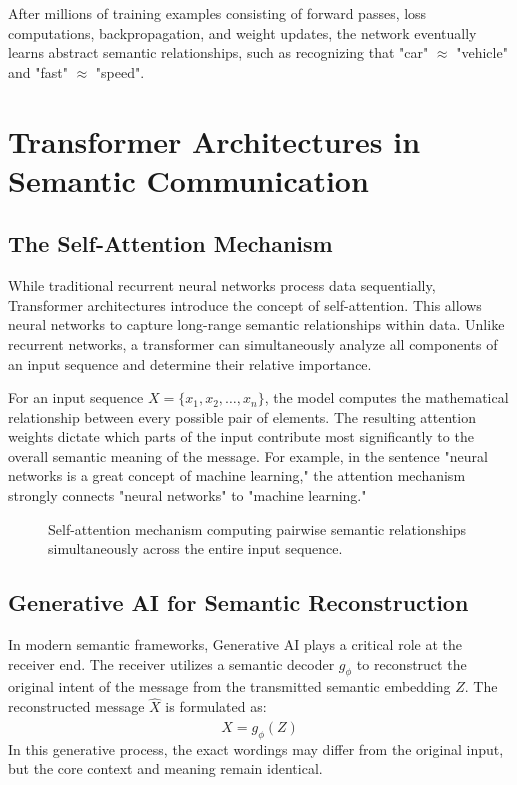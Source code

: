 \documentclass[10pt, conference]{IEEEtran}
\begin{document}
After millions of training examples consisting of forward passes, loss computations, backpropagation, and weight updates, the network eventually learns abstract semantic relationships, such as recognizing that "car" $\approx$ "vehicle" and "fast" $\approx$ "speed".

\section{\large \textbf{Transformer Architectures in Semantic Communication}}

\subsection{\textbf{The Self-Attention Mechanism}}
While traditional recurrent neural networks process data sequentially, Transformer architectures introduce the concept of self-attention. This allows neural networks to capture long-range semantic relationships within data. Unlike recurrent networks, a transformer can simultaneously analyze all components of an input sequence and determine their relative importance.

For an input sequence $X = \{x_1, x_2, \dots, x_n\}$, the model computes the mathematical relationship between every possible pair of elements. The resulting attention weights dictate which parts of the input contribute most significantly to the overall semantic meaning of the message. For example, in the sentence "neural networks is a great concept of machine learning," the attention mechanism strongly connects "neural networks" to "machine learning."

\begin{figure}[h]
\centering
{}
\caption{Self-attention mechanism computing pairwise semantic relationships simultaneously across the entire input sequence.}
\label{fig:self_attention}
\end{figure}

\subsection{\textbf{Generative AI for Semantic Reconstruction}}
In modern semantic frameworks, Generative AI plays a critical role at the receiver end. The receiver utilizes a semantic decoder $g_\phi$ to reconstruct the original intent of the message from the transmitted semantic embedding $Z$. The reconstructed message $\hat{X}$ is formulated as:
\begin{equation}
    \hat{X} = g_\phi(Z)
\end{equation}
In this generative process, the exact wordings may differ from the original input, but the core context and meaning remain identical.
\end{document}
